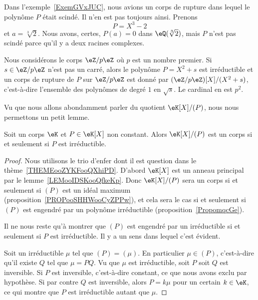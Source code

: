 \begin{example}
    Dans l'exemple~\ref{ExemGVxJUC}, nous avions un corps de rupture dans lequel le polynôme \( P\) était scindé. Il n'en est pas toujours ainsi. Prenons
    \begin{equation}
        P=X^3-2
    \end{equation}
    et \( a=\sqrt[3]{2}\). Nous avons, certes, \( P(a)=0\) dans \( \eQ(\sqrt[3]{2})\), mais \( P\) n'est pas scindé parce qu'il y a deux racines complexes.
\end{example}

\begin{example}
    Nous considérons le corps \( \eZ/p\eZ\) où \( p\) est un nombre premier. Si \( s\in \eZ/p\eZ\) n'est pas un carré, alors le polynôme \(P= X^2+s\) est irréductible et un corps de rupture de \( P\) sur \( \eZ/p\eZ\) est donné par \( (\eZ/p\eZ)[X]/(X^2+s)\), c'est-à-dire l'ensemble des polynômes de degré \( 1\) en \( \sqrt{s}\). Le cardinal en est \( p^2\).
\end{example}

Vu que nous allons abondamment parler du quotient \( \eK[X]/(P)\), nous nous permettons un petit lemme.
\begin{lemma}       \label{LEMooWYYFooXYacdF}
    Soit un corps \( \eK\) et \( P\in \eK[X]\) non constant. Alors \( \eK[X]/(P)\) est un corps si et seulement si \( P\) est irréductible.
\end{lemma}

\begin{proof}
    Nous utilisons le trio d'enfer dont il est question dans le thème~\ref{THEMEooZYKFooQXhiPD}. D'abord \( \eK[X]\) est un anneau principal par le lemme~\ref{LEMooIDSKooQfkeKp}. Donc \( \eK[X]/(P)\) sera un corps si et seulement si \( (P)\) est un idéal maximum (proposition~\ref{PROPooSHHWooCyZPPw}), et cela sera le cas si et seulement si \( (P)\) est engendré par un polynôme irréductible (proposition~\ref{PropomqcGe}).

    Il ne nous reste qu'à montrer que \( (P)\) est engendré par un irréductible si et seulement si \( P\) est irréductible. Il y a un sens dans lequel c'est évident.

    Soit un irréductible \( \mu\) tel que \( (P)=(\mu)\). En particulier \( \mu\in (P)\), c'est-à-dire qu'il existe \( Q\) tel que \( \mu=PQ\). Vu que \( \mu\) est irréductible, soit \( P\) soit \( Q\) est inversible. Si \( P\) est inversible, c'est-à-dire constant, ce que nous avons exclu par hypothèse. Si par contre \( Q\) est inversible, alors \( P=k\mu\) pour un certain \( k\in \eK\), ce qui montre que \( P\) est irréductible autant que \( \mu\).
\end{proof}

